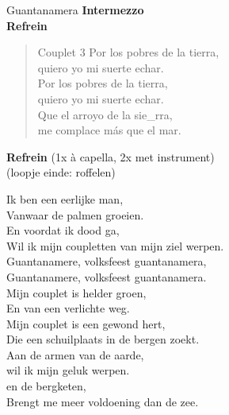\begin{song}{Guantanamera}
\textbf{Intermezzo}\\
\textbf{Refrein}\\

\begin{verse}{Couplet 3}
  \hspace{1em} Por los pobres de la tierra,
  \\
  \hspace{1em} quiero yo mi suerte echar.
  \\
  \hspace{1em} Por los pobres de la tierra,
  \\
  quiero yo mi suerte echar.
  \\
  Que el arroyo de la sie\_rra,
  \\
  me complace m\'{a}s que el mar. \hspace{1em}
\end{verse}

\textbf{Refrein} (1x \`{a} capella, 2x met instrument)\\
(loopje einde:  roffelen)
\end{song}
\begin{translation}
Ik ben een eerlijke man,\\
Vanwaar de palmen groeien.\\
En voordat ik dood ga,\\
Wil ik mijn coupletten van mijn ziel werpen.\\
\vspace*{1\baselineskip}
Guantanamere, volksfeest guantanamera,\\
Guantanamere, volksfeest guantanamera.\\
\vspace*{1\baselineskip}
Mijn couplet is helder groen,\\
En van een verlichte weg.\\
Mijn couplet is een gewond hert,\\
Die een schuilplaats in de bergen zoekt.\\
\vspace*{1\baselineskip}
Aan de armen van de aarde,\\
wil ik mijn geluk werpen.\\
en de bergketen,\\
Brengt me meer voldoening dan de zee.\\
\end{translation}